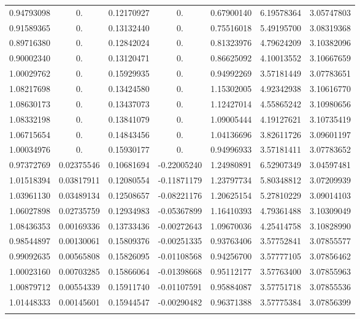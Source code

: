 \documentclass[pdflatex,sn-mathphys-ay]{sn-jnl}%
\theoremstyle{thmstyleone}%
\theoremstyle{thmstyletwo}%
\theoremstyle{thmstylethree}%
\begin{document}
\begin{table}[!h]
\begin{tabular}{ccccccc}
\midrule
\midrule
0.94793098 & 0. & 0.12170927 & 0. & 0.67900140 & 6.19578364 & 3.05747803 \\
 0.91589365 & 0. & 0.13132440 & 0. & 0.75516018 & 5.49195700 & 3.08319368 \\
 0.89716380 & 0. & 0.12842024 & 0. & 0.81323976 & 4.79624209 & 3.10382096 \\
 0.90002340 & 0. & 0.13120471 & 0. & 0.86625092 & 4.10013552 & 3.10667659 \\
 1.00029762 & 0. & 0.15929935 & 0. & 0.94992269 & 3.57181449 & 3.07783651 \\
\midrule
1.08217698 & 0. & 0.13424580 & 0. & 1.15302005 & 4.92342938 & 3.10616770 \\
 1.08630173 & 0. & 0.13437073 & 0. & 1.12427014 & 4.55865242 & 3.10980656 \\
 1.08332198 & 0. & 0.13841079 & 0. & 1.09005444 & 4.19127621 & 3.10735419 \\
 1.06715654 & 0. & 0.14843456 & 0. & 1.04136696 & 3.82611726 & 3.09601197 \\
 1.00034976 & 0. & 0.15930177 & 0. & 0.94996933 & 3.57181411 & 3.07783652 \\
\midrule
0.97372769 & 0.02375546 & 0.10681694 & -0.22005240 & 1.24980891 & 6.52907349 & 3.04597481 \\
 1.01518394 & 0.03817911 & 0.12080554 & -0.11871179 & 1.23797734 & 5.80348812 & 3.07209939 \\
 1.03961130 & 0.03489134 & 0.12508657 & -0.08221176 & 1.20625154 & 5.27810229 & 3.09014103 \\
 1.06027898 & 0.02735759 & 0.12934983 & -0.05367899 & 1.16410393 & 4.79361488 & 3.10309049 \\
 1.08436353 & 0.00169336 & 0.13733436 & -0.00272643 & 1.09670036 & 4.25414758 & 3.10828990 \\
\midrule
0.98544897 & 0.00130061 & 0.15809376 & -0.00251335 & 0.93763406 & 3.57752841 & 3.07855577 \\
 0.99092635 & 0.00565808 & 0.15826095 & -0.01108568 & 0.94256700 & 3.57777105 & 3.07856462 \\
 1.00023160 & 0.00703285 & 0.15866064 & -0.01398668 & 0.95112177 & 3.57763400 & 3.07855963 \\
 1.00879712 & 0.00554339 & 0.15911740 & -0.01107591 & 0.95884087 & 3.57751718 & 3.07855536 \\
 1.01448333 & 0.00145601 & 0.15944547 & -0.00290482 & 0.96371388 & 3.57775384 & 3.07856399 \\
\botrule
\end{tabular}
\end{table}
\end{document}
